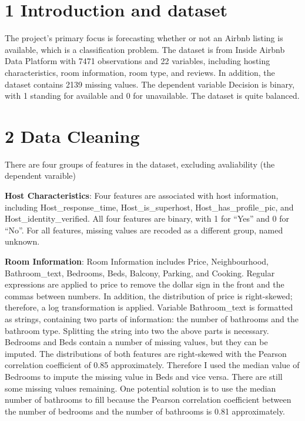 \documentclass[11pt,]{article}
\begin{document}
\vskip -8.5pt



\noindent  

\hypertarget{introduction-and-dataset}{%
\section{1 Introduction and dataset}\label{introduction-and-dataset}}

The project's primary focus is forecasting whether or not an Airbnb
listing is available, which is a classification problem. The dataset is
from Inside Airbnb Data Platform with 7471 observations and 22
variables, including hosting characteristics, room information, room
type, and reviews. In addition, the dataset contains 2139 missing
values. The dependent variable Decision is binary, with 1 standing for
available and 0 for unavailable. The dataset is quite balanced.

\hypertarget{data-cleaning}{%
\section{2 Data Cleaning}\label{data-cleaning}}

There are four groups of features in the dataset, excluding avaliability
(the dependent varaible)

\textbf{Host Characteristics}: Four features are associated with host
information, including Host\_response\_time, Host\_is\_superhost,
Host\_has\_profile\_pic, and Host\_identity\_verified. All four features
are binary, with 1 for ``Yes'' and 0 for ``No''. For all features,
missing values are recoded as a different group, named unknown.

\textbf{Room Information}: Room Information includes Price,
Neighbourhood, Bathroom\_text, Bedrooms, Beds, Balcony, Parking, and
Cooking. Regular expressions are applied to price to remove the dollar
sign in the front and the commas between numbers. In addition, the
distribution of price is right-skewed; therefore, a log transformation
is applied. Variable Bathroom\_text is formatted as strings, containing
two parts of information: the number of bathrooms and the bathroom type.
Splitting the string into two the above parts is necessary. Bedrooms and
Beds contain a number of missing values, but they can be imputed. The
distributions of both features are right-skewed with the Pearson
correlation coefficient of 0.85 approximately. Therefore I used the
median value of Bedrooms to impute the missing value in Beds and vice
versa. There are still some missing values remaining. One potential
solution is to use the median number of bathrooms to fill because the
Pearson correlation coefficient between the number of bedrooms and the
number of bathrooms is 0.81 approximately.
\end{document}
